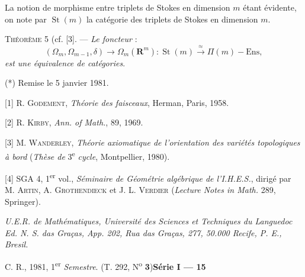 La notion de morphisme entre triplets de Stokes en dimension $m$ étant évidente, on note par $\operatorname{St}(m)$ la catégorie des triplets de Stokes en dimension $m$.

\textsc{Théorème} 5 (cf. [3]. --- \textit{Le foncteur} :
\[
(\Omega_m,\Omega_{m-1},\delta)\to\Omega_m(\mathbf{R}^m):\operatorname{St}(m)\overset{\approx}{\to}\Pi(m)-\mathrm{Ens},
\]
\textit{est une équivalence de catégories}.

(*) Remise le 5 janvier 1981.

[1] R. \textsc{Godement}, \textit{Théorie des faisceaux}, Herman, Paris, 1958.

[2] R. \textsc{Kirby}, \textit{Ann. of Math.}, 89, 1969.

[3] M. \textsc{Wanderley}, \textit{Théorie axiomatique de l'orientation des variétés topologiques à bord} (\textit{Thèse de} 3\textsuperscript{e} \textit{cycle}, Montpellier, 1980).

[4] SGA 4, 1\textsuperscript{er} vol., \textit{Séminaire de Géométrie algébrique de l'I.H.E.S.}, dirigé par M. \textsc{Artin}, A. \textsc{Grothendieck} et J. L. \textsc{Verdier} (\textit{Lecture Notes in Math.} 289, Springer).

\textit{U.E.R. de Mathématiques, Université des Sciences et Techniques du Languedoc}\\
\textit{Ed. N. S. das Graças, App. 202, Rua das Graças, 277, 50.000 Recife, P. E., Bresil.}

C. R., 1981, 1\textsuperscript{er} \textit{Semestre}. (T. 292, N\textsuperscript{o} \textbf{3})\hfill\textbf{Série I --- 15}


